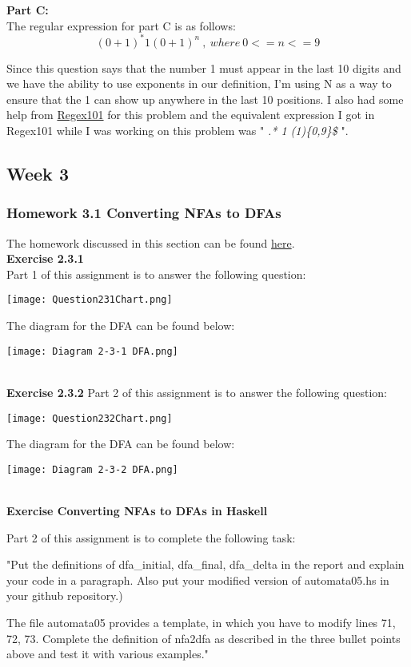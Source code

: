 \documentclass{article}
\theoremstyle{theorem}
\theoremstyle{definition}
\theoremstyle{remark}
\begin{document}
\textbf{Part C:}\\
The regular expression for part C is as follows:
\begin{equation}
    (0+1)^* 1 (0+1)^n\ ,\ where\ 0 <= n <= 9
\end{equation}

Since this question says that the number 1 must appear in the last 10 digits and we have the ability to use exponents in our definition, I'm using N as a way to ensure that the 1 can show up anywhere in the last 10 positions. I also had some help from \href{https://regex101.com/}{Regex101} for this problem and the equivalent expression I got in Regex101 while I was working on this problem was " \textit{.* 1 (1)\{0,9\}\$} ".

\subsection{Week 3}
\subsubsection{Homework 3.1 Converting NFAs to DFAs}
The homework discussed in this section can be found \href{https://hackmd.io/@alexhkurz/HylLKujCP}{here}.\\
\textbf{Exercise 2.3.1}\\
Part 1 of this assignment is to answer the following question:
\begin{center}
    \texttt{[image: Question231Chart.png]}
\end{center}

The diagram for the DFA can be found below:
\begin{center}
    \texttt{[image: Diagram 2-3-1 DFA.png]}
\end{center}
\\
\textbf{Exercise 2.3.2}
Part 2 of this assignment is to answer the following question:
\begin{center}
    \texttt{[image: Question232Chart.png]}
\end{center}

The diagram for the DFA can be found below:
\begin{center}
    \texttt{[image: Diagram 2-3-2 DFA.png]}
\end{center}
\\
\textbf{Exercise Converting NFAs to DFAs in Haskell}

Part 2 of this assignment is to complete the following task:
\begin{center}
"Put the definitions of dfa\_initial, dfa\_final, dfa\_delta in the report and explain your code in a paragraph. Also put your modified version of automata05.hs in your github repository.)

The file automata05 provides a template, in which you have to modify lines 71, 72, 73. Complete the definition of nfa2dfa as described in the three bullet points above and test it with various examples."
\end{center}
\end{document}
